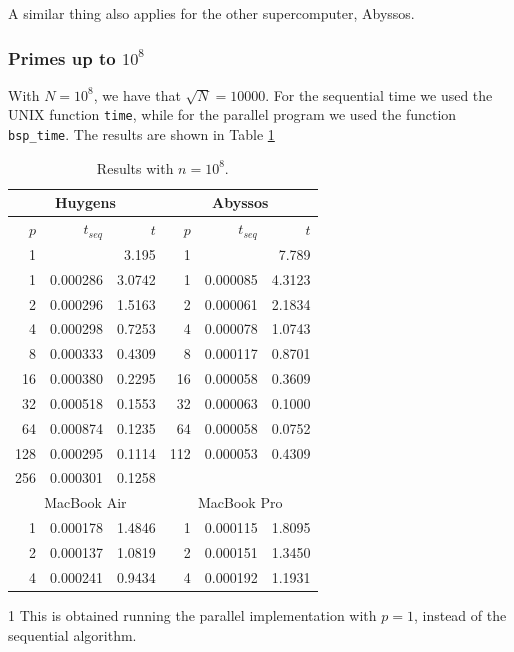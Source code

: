 \documentclass[a4paper,11pt]{article}
\begin{document}
A similar thing also applies for the other supercomputer, Abyssos.

\subsubsection{Primes up to $10^8$}

With $N=10^8$, we have that $\sqrt{N} = 10000$. For the sequential time we used the UNIX function \verb|time|, while for the parallel program we used the function \verb|bsp_time|. The results are shown in Table \ref{tab:1e8}

\begin{table}
\begin{center}
\begin{threeparttable}
\begin{tabular}{|r r r|r r r|}
\hline
\multicolumn{3}{|c|}{Huygens} & \multicolumn{3}{c|}{Abyssos} \\
\hline
$p$ & $t_{seq}$ & $t$ & $p$ & $t_{seq}$ & $t$ \\
\hline
1 & & 3.195 & 1 & & 7.789 \\
1\tnote{1} &  0.000286  & 3.0742 & 1\tnote{1} & 0.000085 & 4.3123 \\
2 & 0.000296 & 1.5163 & 2 & 0.000061 & 2.1834 \\
4 & 0.000298 & 0.7253 & 4 & 0.000078 & 1.0743\\
8 & 0.000333 & 0.4309 & 8 & 0.000117 & 0.8701 \\
16 & 0.000380 & 0.2295 & 16 & 0.000058 & 0.3609 \\
32 & 0.000518 & 0.1553 & 32 & 0.000063 & 0.1000\\
64 & 0.000874 & 0.1235 & 64 & 0.000058 & 0.0752\\
128 & 0.000295 & 0.1114 & 112 & 0.000053 & 0.4309\\
256 & 0.000301 & 0.1258 & & &\\
\hline
\multicolumn{3}{|c|}{MacBook Air} & \multicolumn{3}{c|}{MacBook Pro} \\
\hline
1\tnote{1} & 0.000178 & 1.4846 & 1\tnote{1} & 0.000115 & 1.8095 \\
2 & 0.000137 & 1.0819 & 2 & 0.000151 & 1.3450 \\
4 & 0.000241 & 0.9434 & 4& 0.000192 & 1.1931 \\
\hline
\end{tabular}
\begin{tablenotes}
\item [1] \small{This is obtained running the parallel implementation with $p=1$, instead of the sequential algorithm.}
\end{tablenotes}
\end{threeparttable}
\caption{Results with $n=10^8$.} \label{tab:1e8}
\end{center}
\end{table}
\end{document}
